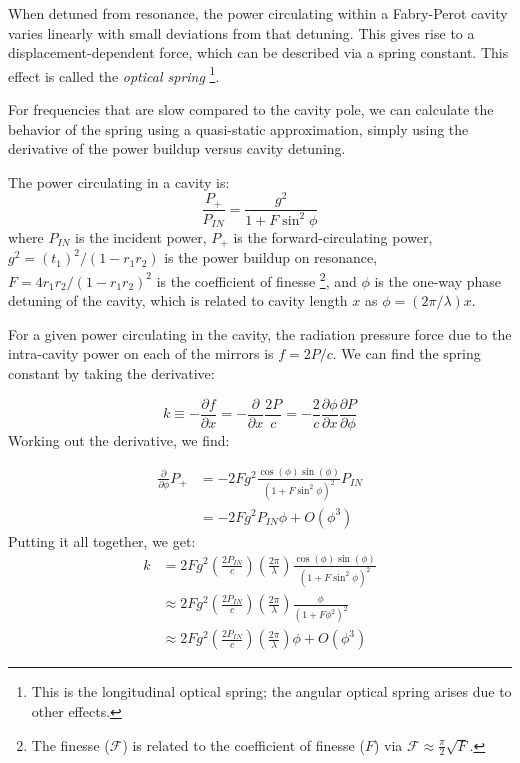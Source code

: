 When detuned from resonance, the power circulating within a Fabry-Perot
cavity varies linearly with small deviations from that detuning. This
gives rise to a displacement-dependent force, which can be described
via a spring constant. This effect is called the \emph{optical spring}%
\footnote{This is the longitudinal optical spring; the angular optical spring
arises due to other effects. %
}. 

For frequencies that are slow compared to the cavity pole, we can
calculate the behavior of the spring using a quasi-static approximation,
simply using the derivative of the power buildup versus cavity detuning.

The power circulating in a cavity is:
\begin{equation}
\frac{P_{+}}{P_{IN}}=\frac{g^{2}}{1+F\sin^{2}\phi}
\end{equation}
where $P_{IN}$ is the incident power, $P_{+}$ is the forward-circulating
power, $g^{2}=\left(t_{1}\right)^{2}/\left(1-r_{1}r_{2}\right)$ is
the power buildup on resonance, $F=4r_{1}r_{2}/\left(1-r_{1}r_{2}\right)^{2}$
is the coefficient of finesse%
\footnote{The finesse ($\mathcal{F}$) is related to the coefficient of finesse
($F$) via $\mathcal{F}\approx\frac{\pi}{2}\sqrt{F}$.%
}, and $\phi$ is the one-way phase detuning of the cavity, which is
related to cavity length $x$ as $\phi=(2\pi/\lambda)x$. 

For a given power circulating in the cavity, the radiation pressure
force due to the intra-cavity power on each of the mirrors is $f=2P/c$.
We can find the spring constant by taking the derivative:

\[
k\equiv-\frac{\partial f}{\partial x}=-\frac{\partial}{\partial x}\frac{2P}{c}=-\frac{2}{c}\frac{\partial\phi}{\partial x}\frac{\partial P}{\partial\phi}
\]
Working out the derivative, we find:

\begin{align}
\frac{\partial}{\partial\phi}P_{+} & =-2Fg^{2}\frac{\cos(\phi)\sin(\phi)}{\left(1+F\sin^{2}\phi\right)^{2}}P_{IN}\\
 & =-2Fg^{2}P_{IN}\phi+O\left(\phi^{3}\right)
\end{align}
Putting it all together, we get:
\begin{align}
k & =2Fg^{2}\left(\frac{2P_{IN}}{c}\right)\left(\frac{2\pi}{\lambda}\right)\frac{\cos(\phi)\sin(\phi)}{\left(1+F\sin^{2}\phi\right)^{2}}\label{eq:spring-constant}\\
 & \approx2Fg^{2}\left(\frac{2P_{IN}}{c}\right)\left(\frac{2\pi}{\lambda}\right)\frac{\phi}{\left(1+F\phi^{2}\right)^{2}}\label{eq:spring-constant-approx1}\\
 & \approx2Fg^{2}\left(\frac{2P_{IN}}{c}\right)\left(\frac{2\pi}{\lambda}\right)\phi+O\left(\phi^{3}\right)
\end{align}


